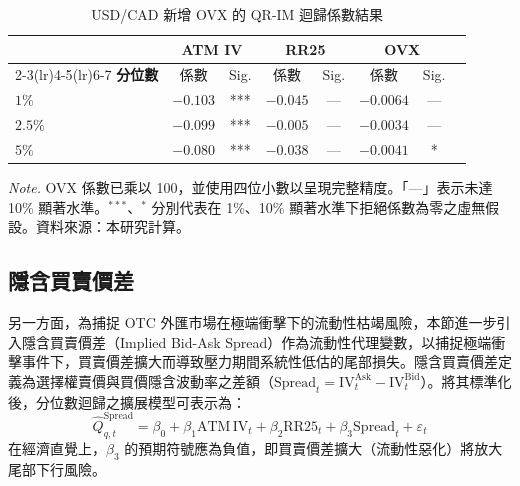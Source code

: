 \begin{table}[htbp]
    \centering
    \linespread{1.2}\selectfont
    \renewcommand{\arraystretch}{1.2}
    \fontsize{11pt}{15pt}\selectfont
    \vspace{3mm}
    \caption{USD/CAD 新增 OVX 的 QR-IM 迴歸係數結果}
    \label{tab:r4_coef}
    \begin{tabular}{lccccccc}
        \hline
        & \multicolumn{2}{c}{\textbf{ATM IV}} & \multicolumn{2}{c}{\textbf{RR25}}
        & \multicolumn{2}{c}{\textbf{OVX}} \\
        \cmidrule(lr){2-3}\cmidrule(lr){4-5}\cmidrule(lr){6-7}
        \textbf{分位數} & 係數 & Sig. & 係數 & Sig. & 係數 & Sig. \\
        \hline
        $1\%$   & $-0.103$ & *** & $-0.045$ & — & $-0.0064$ & — \\
        $2.5\%$ & $-0.099$ & *** & $-0.005$ & — & $-0.0034$ & — \\
        $5\%$   & $-0.080$ & *** & $-0.038$ & — & $-0.0041$ & * \\
        \hline
    \end{tabular}
    
    \vspace{3mm}
    
    \begin{minipage}{0.75\textwidth}
        \fontsize{9pt}{13pt}\selectfont
        \textit{Note.} OVX 係數已乘以 100，並使用四位小數以呈現完整精度。「—」表示未達 10\% 顯著水準。$^{***}$、$^{*}$ 分別代表在 1\%、10\% 顯著水準下拒絕係數為零之虛無假設。資料來源：本研究計算。
    \end{minipage}
\end{table}

\subsection{隱含買賣價差}

另一方面，為捕捉 OTC 外匯市場在極端衝擊下的流動性枯竭風險，本節進一步引入隱含買賣價差（Implied Bid-Ask Spread）作為流動性代理變數，以捕捉極端衝擊事件下，買賣價差擴大而導致壓力期間系統性低估的尾部損失。隱含買賣價差定義為選擇權賣價與買價隱含波動率之差額（$\mathrm{Spread}_t = \mathrm{IV}_{t}^{\mathrm{Ask}} - \mathrm{IV}_{t}^{\mathrm{Bid}}$）。將其標準化後，分位數迴歸之擴展模型可表示為：
\begin{equation}
    \widehat{Q}_{q,t}^{\mathrm{Spread}}
    = 
    \beta_0 + 
    \beta_1 \mathrm{ATM\,IV}_t + 
    \beta_2 \mathrm{RR25}_{t} + 
    \beta_3 \mathrm{Spread}_t + 
    \varepsilon_t
    \label{eq:r5_spec}
\end{equation}
在經濟直覺上，$\beta_3$ 的預期符號應為負值，即買賣價差擴大（流動性惡化）將放大尾部下行風險。

